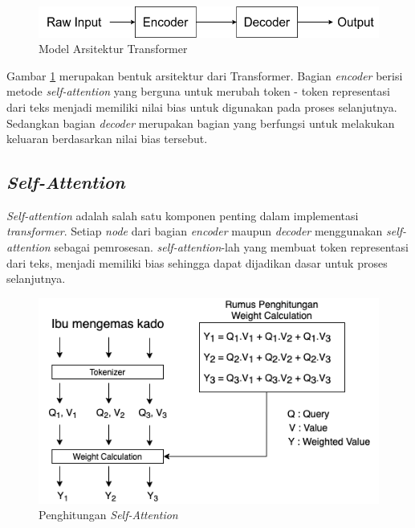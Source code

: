 \begin{figure}[h]
    \centering
    \includegraphics[width=\textwidth]{gambar/transformer_architecture.png}
    \caption{Model Arsitektur Transformer}
    \label{fig: architecture_transformer}
\end{figure}

Gambar \ref{fig: architecture_transformer} merupakan bentuk arsitektur dari Transformer. Bagian \textit{encoder} berisi metode \textit{self-attention} yang berguna untuk merubah token - token representasi dari teks menjadi memiliki nilai bias untuk digunakan pada proses selanjutnya. Sedangkan bagian \textit{decoder} merupakan bagian yang berfungsi untuk melakukan keluaran berdasarkan nilai bias tersebut.

\subsection{\textit{Self-Attention}}

\textit{Self-attention} adalah salah satu komponen penting dalam implementasi \textit{transformer}. Setiap \textit{node} dari bagian \textit{encoder} maupun \textit{decoder} menggunakan \textit{self-attention} sebagai pemrosesan. \textit{self-attention}-lah yang membuat token representasi dari teks, menjadi memiliki bias sehingga dapat dijadikan dasar untuk proses selanjutnya.

\begin{figure}[h]
    \centering
    \includegraphics[width=\textwidth]{gambar/self-attention.png}
    \caption{Penghitungan \textit{Self-Attention}}
    \label{fig: self_attention}
\end{figure}

